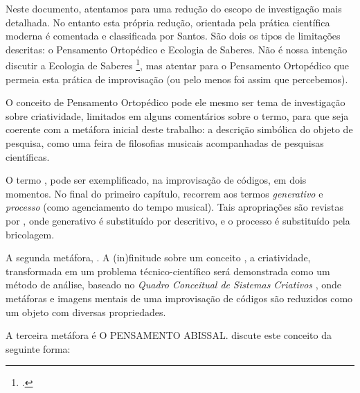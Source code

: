 Neste documento, atentamos para uma redução do escopo de investigação mais detalhada. No entanto esta própria redução, orientada pela prática científica moderna é comentada e classificada por Santos. São dois os tipos de limitações descritas: o Pensamento Ortopédico e Ecologia de Saberes. Não é nossa intenção discutir a Ecologia de Saberes \footnote{.}, mas atentar para o Pensamento Ortopédico que permeia esta prática de improvisação (ou pelo menos foi assim que percebemos). 

O conceito de Pensamento Ortopédico pode ele mesmo ser tema de investigação sobre criatividade, limitados em  alguns comentários sobre o termo, para que seja coerente com a metáfora inicial deste trabalho: a descrição simbólica do objeto de pesquisa, como uma feira de filosofias musicais acompanhadas de pesquisas científicas. 

O termo , pode ser exemplificado, na improvisação de códigos, em dois momentos. No final do primeiro capítulo,  recorrem aos termos \emph{generativo} e \emph{processo} (como agenciamento do tempo musical). Tais apropriações são revistas por , onde generativo é substituído por descritivo, e o processo é substituído pela bricolagem. 

A segunda metáfora,  \cite[p.~15]{santos_filosofia_2008}. A (in)finitude sobre um conceito , a criatividade, transformada em um problema técnico-científico será demonstrada como um método de análise, baseado no \emph{Quadro Conceitual de Sistemas Criativos} \cite{mclean_music_2006,Forth2010}, onde metáforas e imagens mentais de uma improvisação de códigos são reduzidos como um objeto com diversas propriedades. 

A terceira metáfora é \MakeTextUppercase{o pensamento abissal}.  discute este conceito da seguinte forma:

